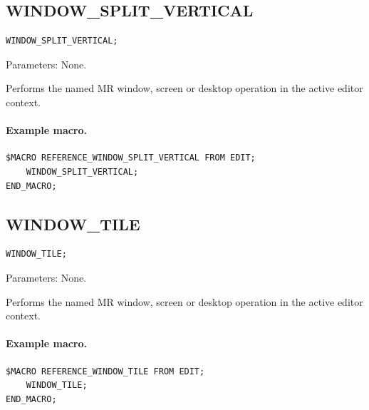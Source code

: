 \documentclass[a4paper,10pt,twoside,openany]{book}
\newenvironment{mrmacextension}{\begin{changebar}}{\end{changebar}}
\begin{document}
\begin{mrmacextension}
\label{prim:procedure-window-split-vertical}
\subsection*{WINDOW\_SPLIT\_VERTICAL}
\begin{verbatim}
WINDOW_SPLIT_VERTICAL;
\end{verbatim}
Parameters: None.

Performs the named MR window, screen or desktop operation in the active editor context.

\paragraph{Example macro.}
\begin{verbatim}
$MACRO REFERENCE_WINDOW_SPLIT_VERTICAL FROM EDIT;
    WINDOW_SPLIT_VERTICAL;
END_MACRO;
\end{verbatim}
\end{mrmacextension}

\begin{mrmacextension}
\label{prim:procedure-window-tile}
\subsection*{WINDOW\_TILE}
\begin{verbatim}
WINDOW_TILE;
\end{verbatim}
Parameters: None.

Performs the named MR window, screen or desktop operation in the active editor context.

\paragraph{Example macro.}
\begin{verbatim}
$MACRO REFERENCE_WINDOW_TILE FROM EDIT;
    WINDOW_TILE;
END_MACRO;
\end{verbatim}
\end{mrmacextension}
\end{document}
